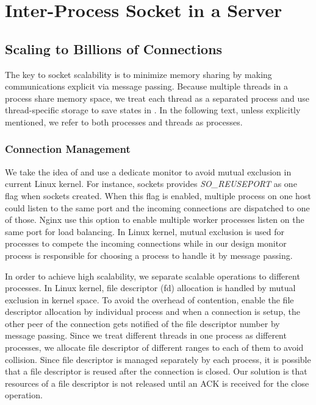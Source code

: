 \section{Inter-Process Socket in a Server}
\label{sec:intra-server}

\subsection{Scaling to Billions of Connections}
\label{subsec:socket-api}

The key to socket scalability is to minimize memory sharing by making communications explicit via message passing. Because multiple threads in a process share memory space, we treat each thread as a separated process and use thread-specific storage to save states in \libipc. In the following text, unless explicitly mentioned, we refer to both processes and threads as processes.


\subsubsection{Connection Management}
\label{subsubsec:connection_management}

We take the idea of \cite{roghanchi2017ffwd} and use a dedicate monitor to avoid mutual exclusion in current Linux kernel. For instance, sockets provides \textit{SO\_REUSEPORT} as one flag when sockets created. When this flag is enabled, multiple process on one host could listen to the same port and the incoming connections are dispatched to one of those. Nginx use this option to enable multiple worker processes listen on the same port for load balancing. In Linux kernel, mutual exclusion is used for processes to compete the incoming connections while in our design monitor process is responsible for choosing a process to handle it by message passing.

In order to achieve high scalability, we separate scalable operations to different processes. In Linux kernel, file descriptor (fd) allocation is handled by mutual exclusion in kernel space. To avoid the overhead of contention, \libipc enable the file descriptor allocation by individual process and when a connection is setup, the other peer of the connection gets notified of the file descriptor number by message passing. Since we treat different threads in one process as different processes, we allocate file descriptor of different ranges to each of them to avoid collision. Since file descriptor is managed separately by each process, it is possible that a file descriptor is reused after the connection is closed. Our solution is that resources of a file descriptor is not released until an ACK is received for the close operation.

